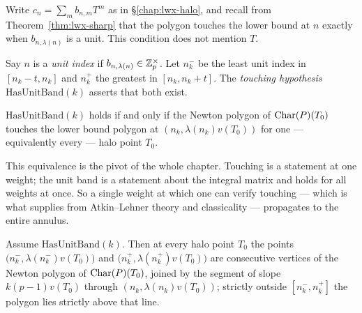 Write $c_n = \sum_m b_{n,m}T^{m}$ as in \S\ref{chap:lwx-halo}, and recall from
Theorem~\ref{thm:lwx-sharp} that the polygon touches the lower bound at $n$ exactly when
$b_{n,\lambda(n)}$ is a unit.  This condition does not mention $T$.

\begin{definition}
  \label{def:unitband}
  \leanok
  Say $n$ is a \emph{unit index} if $b_{n,\lambda(n)}\in\mathbb{Z}_p^{\times}$.  Let
  $n_k^{-}$ be the least unit index in $[n_k-t, n_k]$ and $n_k^{+}$ the greatest in
  $[n_k, n_k+t]$.  The \emph{touching hypothesis} $\mathrm{HasUnitBand}(k)$ asserts that both
  exist.
\end{definition}

\begin{lemma}
  \label{lem:unitband-from-touching}
  \leanok
  $\mathrm{HasUnitBand}(k)$ holds if and only if the Newton polygon of $\operatorname{Char}(P)(T_0)$ touches
  the lower bound polygon at $(n_k, \lambda(n_k)v(T_0))$ for one --- equivalently every --- halo
  point $T_0$.
\end{lemma}

This equivalence is the pivot of the whole chapter.  Touching is a statement at one weight; the
unit band is a statement about the integral matrix and holds for all weights at once.  So a
single weight at which one can verify touching --- which is what \cite[\S3.23 Step I]{LWX}
supplies from Atkin--Lehner theory and classicality --- propagates to the entire annulus.

\begin{theorem}
  \label{thm:lwx13-vertices}
  \leanok
  Assume $\mathrm{HasUnitBand}(k)$.  Then at every halo point $T_0$ the points
  $\bigl(n_k^{-}, \lambda(n_k^{-})v(T_0)\bigr)$ and $\bigl(n_k^{+}, \lambda(n_k^{+})v(T_0)\bigr)$
  are consecutive vertices of the Newton polygon of $\operatorname{Char}(P)(T_0)$, joined by the segment of
  slope $k(p-1)v(T_0)$ through $(n_k,\lambda(n_k)v(T_0))$; strictly outside $[n_k^-, n_k^+]$ the
  polygon lies strictly above that line.
\end{theorem}

